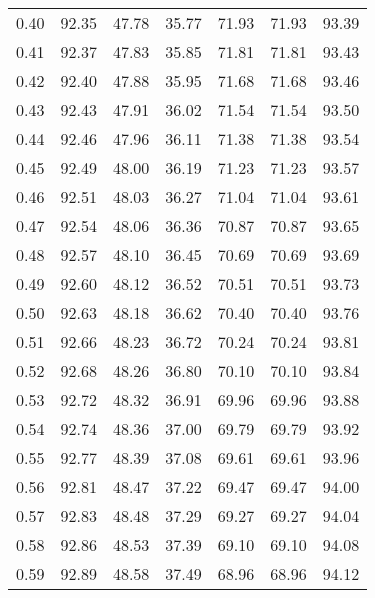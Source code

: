 \begin{tabular}{|c|c|c|c|c|c|c|}
      0.40 &     92.35 &     47.78 &      35.77 &   71.93 &      71.93 &         93.39 \\
      0.41 &     92.37 &     47.83 &      35.85 &   71.81 &      71.81 &         93.43 \\
      0.42 &     92.40 &     47.88 &      35.95 &   71.68 &      71.68 &         93.46 \\
      0.43 &     92.43 &     47.91 &      36.02 &   71.54 &      71.54 &         93.50 \\
      0.44 &     92.46 &     47.96 &      36.11 &   71.38 &      71.38 &         93.54 \\
      0.45 &     92.49 &     48.00 &      36.19 &   71.23 &      71.23 &         93.57 \\
      0.46 &     92.51 &     48.03 &      36.27 &   71.04 &      71.04 &         93.61 \\
      0.47 &     92.54 &     48.06 &      36.36 &   70.87 &      70.87 &         93.65 \\
      0.48 &     92.57 &     48.10 &      36.45 &   70.69 &      70.69 &         93.69 \\
      0.49 &     92.60 &     48.12 &      36.52 &   70.51 &      70.51 &         93.73 \\
      0.50 &     92.63 &     48.18 &      36.62 &   70.40 &      70.40 &         93.76 \\
      0.51 &     92.66 &     48.23 &      36.72 &   70.24 &      70.24 &         93.81 \\
      0.52 &     92.68 &     48.26 &      36.80 &   70.10 &      70.10 &         93.84 \\
      0.53 &     92.72 &     48.32 &      36.91 &   69.96 &      69.96 &         93.88 \\
      0.54 &     92.74 &     48.36 &      37.00 &   69.79 &      69.79 &         93.92 \\
      0.55 &     92.77 &     48.39 &      37.08 &   69.61 &      69.61 &         93.96 \\
      0.56 &     92.81 &     48.47 &      37.22 &   69.47 &      69.47 &         94.00 \\
      0.57 &     92.83 &     48.48 &      37.29 &   69.27 &      69.27 &         94.04 \\
      0.58 &     92.86 &     48.53 &      37.39 &   69.10 &      69.10 &         94.08 \\
      0.59 &     92.89 &     48.58 &      37.49 &   68.96 &      68.96 &         94.12 \\

\end{tabular}
